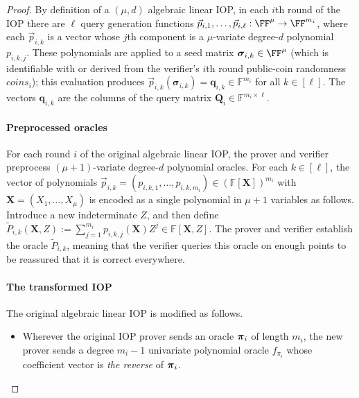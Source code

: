 \begin{proof}
By definition of a $(\mu, d)$ algebraic linear IOP, in each $i$th round of the IOP there are $\ell$ query generation functions $\vec{p}_{i,1},\ldots,\vec{p}_{i,\ell}: \FF^\mu \rightarrow \FF^{m_i}$, where each $\vec{p}_{i,k}$ is a vector whose $j$th component is a $\mu$-variate degree-$d$ polynomial $p_{i,k,j}$. These polynomials are applied to a seed matrix $\boldsymbol{\sigma}_{i,k} \in \FF^\mu$ (which is identifiable with or derived from the verifier's $i$th round public-coin randomness $\mathit{coins}_i$); this evaluation produces $\vec{p}_{i,k}(\boldsymbol{\sigma}_{i,k}) = \mathbf{q}_{i,k} \in \mathbb{F}^{m_i}$ for all $k \in [\ell]$. The vectors $\mathbf{q}_{i,k}$ are the columns of the query matrix $\mathbf{Q}_i \in \mathbb{F}^{m_i \times \ell}$.

\paragraph{Preprocessed oracles} 
For each round $i$ of the original algebraic linear IOP, the prover and verifier preprocess $(\mu+1)$-variate degree-$d$ polynomial oracles. %
For each $k \in [\ell]$, the vector of polynomials $\vec{p}_{i,k} = (p_{i,k,1},\ldots,p_{i,k, m_i}) \in (\mathbb{F}[\mathbf{X}])^{m_i}$ with $\mathbf{X} = (X_1,\ldots,X_\mu)$ is encoded as a single polynomial in $\mu + 1$ variables as follows. Introduce a new indeterminate $Z$, and then define $\tilde{P}_{i,k}(\mathbf{X}, Z) := \sum_{j=1}^{m_i} p_{i,k,j}(\mathbf{X}) Z^j \in \mathbb{F}[\mathbf{X},Z]$.
The prover and verifier establish the oracle $\tilde{P}_{i,k}$, meaning that the verifier queries this oracle on enough points to be reassured that it is correct everywhere.

\paragraph{The transformed IOP} 
The original algebraic linear IOP is modified as follows. 

\begin{itemize}

\item Wherever the original IOP prover sends an oracle $\boldsymbol{\pi}_i$ of length $m_i$, the new prover sends a degree $m_i - 1$ univariate polynomial oracle $f_{\pi_i}$ whose coefficient vector is \emph{the reverse} of $\boldsymbol{\pi}_i$. 


\end{itemize}
\end{proof}
